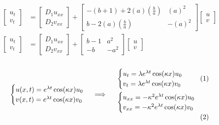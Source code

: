 \documentclass[12pt]{article}
\begin{document}
\begin{enumerate}
    \color{blue}
    \begin{align*}
        \begin{bmatrix}
            u_t\\v_t
        \end{bmatrix} &= \begin{bmatrix}
            D_1u_{xx}\\D_2v_{xx}
        \end{bmatrix} + \begin{bmatrix}
            -(b + 1)+2(a)(\frac{b}{a}) & (a)^2\\
            b - 2(a)(\frac{b}{a}) & -(a)^2
        \end{bmatrix} \begin{bmatrix}
            u\\v
        \end{bmatrix}\\
        \begin{bmatrix}
            u_t\\v_t
        \end{bmatrix} &= \begin{bmatrix}
            D_1u_{xx}\\D_2v_{xx}
        \end{bmatrix} + \begin{bmatrix}
            b - 1 & a^2\\
            -b & -a^2
        \end{bmatrix} \begin{bmatrix}
            u\\v
        \end{bmatrix}
    \end{align*}
    \[\begin{cases}
            u(x, t) = e^{\lambda t}\cos(\kappa x)u_0\\
            v(x, t) = e^{\lambda t}\cos(\kappa x)v_0
        \end{cases} \implies 
    \parbox{2in}{
        \begin{align*}
            &\begin{cases}
                u_t = \lambda e^{\lambda t}\cos(\kappa x)u_0\\
                v_t = \lambda e^{\lambda t}\cos(\kappa x)v_0
            \end{cases}\\
            &\begin{cases}
                u_{xx} = -\kappa^2 e^{\lambda t}\cos(\kappa x)u_0\\
                v_{xx} = -\kappa^2 e^{\lambda t}\cos(\kappa x)v_0
            \end{cases}
        \end{align*}
    }\]


\end{enumerate}
\end{document}

